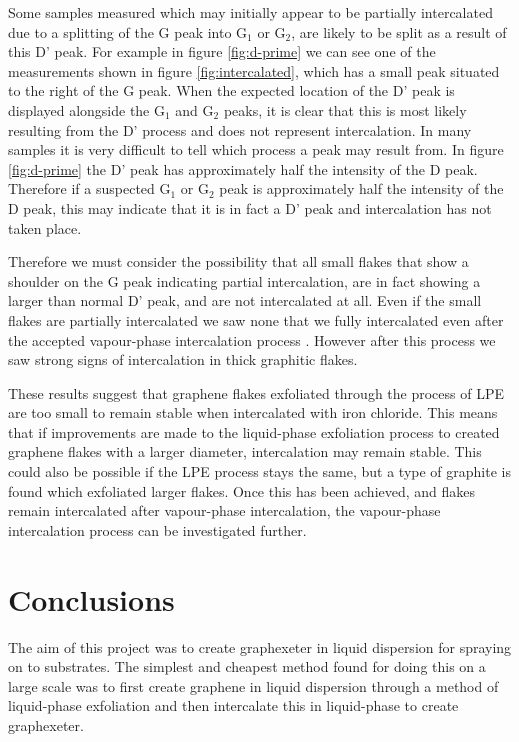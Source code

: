 \documentclass[12pt,titlepage]{article}
\begin{document}
	Some samples measured which may initially appear to be partially intercalated due to a splitting of the G peak into G$_1$ or G$_2$, are likely to be split as a result of this D' peak. For example in figure \ref{fig:d-prime} we can see one of the measurements shown in figure \ref{fig:intercalated}, which has a small peak situated to the right of the G peak. When the expected location of the D' peak is displayed alongside the G$_1$ and G$_2$ peaks, it is clear that this is most likely resulting from the D' process and does not represent intercalation. In many samples it is very difficult to tell which process a peak may result from. In figure \ref{fig:d-prime} the D' peak has approximately half the intensity of the D peak. Therefore if a suspected G$_1$ or G$_2$ peak is approximately half the intensity of the D peak, this may indicate that it is in fact a D' peak and intercalation has not taken place.
	
	
	Therefore we must consider the possibility that all small flakes that show a shoulder on the G peak indicating partial intercalation, are in fact showing a larger than normal D' peak, and are not intercalated at all. Even if the small flakes are partially intercalated we saw none that we fully intercalated even after the accepted vapour-phase intercalation process \cite{Khrapach2012a}. However after this process we saw strong signs of intercalation in thick graphitic flakes.
	
	These results suggest that graphene flakes exfoliated through the process of LPE are too small to remain stable when intercalated with iron chloride. This means that if improvements are made to the liquid-phase exfoliation process to created graphene flakes with a larger diameter, intercalation may remain stable. This could also be possible if the LPE process stays the same, but a type of graphite is found which exfoliated larger flakes. Once this has been achieved, and flakes remain intercalated after vapour-phase intercalation, the vapour-phase intercalation process can be investigated further.
			
	\newpage
	\section{Conclusions}
	
	The aim of this project was to create graphexeter in liquid dispersion for spraying on to substrates. The simplest and cheapest method found for doing this on a large scale was to first create graphene in liquid dispersion through a method of liquid-phase exfoliation and then intercalate this in liquid-phase to create graphexeter.
	
\end{document}
